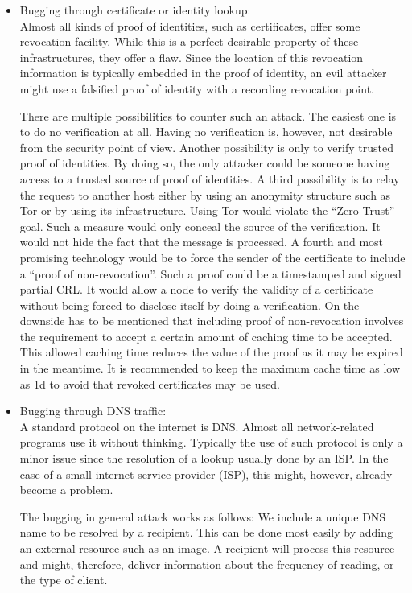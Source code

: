 \begin{itemize}
	\item Bugging through certificate or identity lookup:\\
	Almost all kinds of proof of identities, such as certificates, offer some revocation facility. While this is a perfect desirable property of these infrastructures, they offer a flaw. Since the location of this revocation information is typically embedded in the proof of identity, an evil attacker might use a falsified proof of identity with a recording revocation point.
	
	There are multiple possibilities to counter such an attack. The easiest one is to do no verification at all. Having no verification is, however, not desirable from the security point of view. Another possibility is only to verify trusted proof of identities. By doing so, the only attacker could be someone having access to a trusted source of proof of identities. A third possibility is to relay the request to another host either by using an anonymity structure such as Tor or by using its infrastructure. Using Tor would violate the ``Zero Trust'' goal. Such a measure would only conceal the source of the verification. It would not hide the fact that the message is processed. A fourth and most promising technology would be to force the sender of the certificate to include a ``proof of non-revocation''. Such a proof could be a timestamped and signed partial CRL. It would allow a node to verify the validity of a certificate without being forced to disclose itself by doing a verification. On the downside has to be mentioned that including proof of non-revocation involves the requirement to accept a certain amount of caching time to be accepted. This allowed caching time reduces the value of the proof as it may be expired in the meantime. It is recommended to keep the maximum cache time as low as 1d to avoid that revoked certificates may be used. 
	
	\item Bugging through DNS traffic:\\
	A standard protocol on the internet is DNS. Almost all network-related programs use it without thinking. Typically the use of such protocol is only a minor issue since the resolution of a lookup usually done by an ISP. In the case of a small internet service provider (ISP), this might, however, already become a problem.
	
	The bugging in general attack works as follows: We include a unique DNS name to be resolved by a recipient. This can be done most easily by adding an external resource such as an image. A recipient will process this resource and might, therefore, deliver information about the frequency of reading, or the type of client. 
	

\end{itemize}
